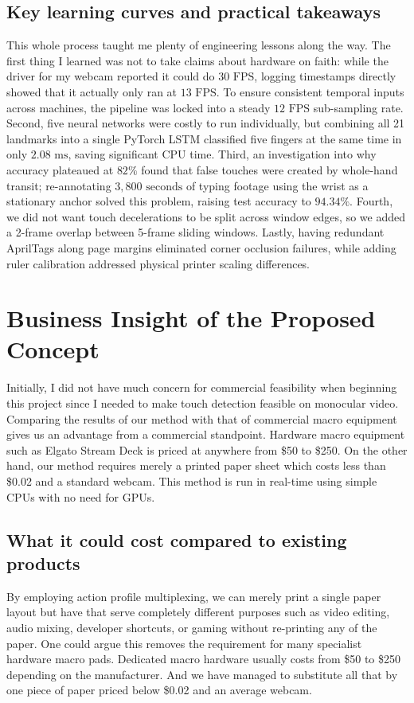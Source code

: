\subsection{Key learning curves and practical takeaways}
\label{subsec:concl_learning_curves}
This whole process taught me plenty of engineering lessons along the way. The first thing I learned was not to take claims about hardware on faith: while the driver for my webcam reported it could do $30\text{ FPS}$, logging timestamps directly showed that it actually only ran at $13\text{ FPS}$. To ensure consistent temporal inputs across machines, the pipeline was locked into a steady $12\text{ FPS}$ sub-sampling rate. Second, five neural networks were costly to run individually, but combining all 21 landmarks into a single PyTorch LSTM classified five fingers at the same time in only $2.08\text{ ms}$, saving significant CPU time. Third, an investigation into why accuracy plateaued at $82\%$ found that false touches were created by whole-hand transit; re-annotating $3,800\text{ seconds}$ of typing footage using the wrist as a stationary anchor solved this problem, raising test accuracy to $94.34\%$. Fourth, we did not want touch decelerations to be split across window edges, so we added a 2-frame overlap between 5-frame sliding windows. Lastly, having redundant AprilTags along page margins eliminated corner occlusion failures, while adding ruler calibration addressed physical printer scaling differences.

\section{Business Insight of the Proposed Concept}
\label{sec:concl_business}
Initially, I did not have much concern for commercial feasibility when beginning this project since I needed to make touch detection feasible on monocular video. Comparing the results of our method with that of commercial macro equipment gives us an advantage from a commercial standpoint. Hardware macro equipment such as Elgato Stream Deck is priced at anywhere from \$50 to \$250. On the other hand, our method requires merely a printed paper sheet which costs less than \$0.02 and a standard webcam. This method is run in real-time using simple CPUs with no need for GPUs.

\subsection{What it could cost compared to existing products}
\label{subsec:concl_commercial}
By employing action profile multiplexing, we can merely print a single paper layout but have that serve completely different purposes such as video editing, audio mixing, developer shortcuts, or gaming without re-printing any of the paper. One could argue this removes the requirement for many specialist hardware macro pads. Dedicated macro hardware usually costs from \$50 to \$250 depending on the manufacturer. And we have managed to substitute all that by one piece of paper priced below \$0.02 and an average webcam.

